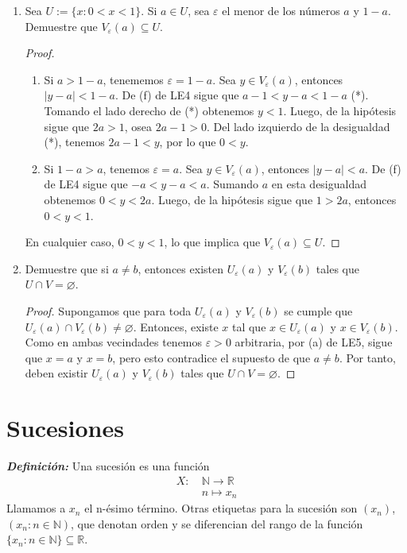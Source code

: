 \documentclass[11pt]{article}
\newcommand{\N}{\mathbb{N}}
\newcommand{\R}{\mathbb{R}}
\newcommand{\bfit}[1]{\textbf{\textit{#1}}}
\let\epsilon\varepsilon
\let\emptyset\varnothing
\begin{document}
\begin{enumerate}[label=\alph*)]
    \item Sea $U:=\{x: 0<x<1\}$. Si $a\in U$, sea $\varepsilon$ el menor de los números $a$ y $1-a$. Demuestre que $V_\varepsilon(a) \subseteq U$.
    \vspace{-1em}\begin{proof} \leavevmode
        \begin{enumerate}[label=\roman*)]
            \item Si $a>1-a$, tenememos $\varepsilon=1-a$. Sea $y\in V_\varepsilon(a)$, entonces $|y-a|<1-a$. De (f) de LE4 sigue que $a-1<y-a<1-a$ (*). Tomando el lado derecho de (*) obtenemos $y<1$. Luego, de la hipótesis sigue que $2a>1$, osea $2a-1>0$. Del lado izquierdo de la desigualdad (*), tenemos $2a-1<y$, por lo que $0<y$.
            \item Si $1-a>a$, tenemos $\varepsilon=a$. Sea $y\in V_\varepsilon(a)$, entonces $|y-a|<a$. De (f) de LE4 sigue que $-a<y-a<a$. Sumando $a$ en esta desigualdad obtenemos $0<y<2a$. Luego, de la hipótesis sigue que $1>2a$, entonces $0<y<1$.\end{enumerate}
            En cualquier caso, $0<y<1$, lo que implica que $V_\varepsilon(a) \subseteq U$.    
    \end{proof} \vspace{-1em}

    \item Demuestre que si $a\neq b$, entonces existen $U_\varepsilon(a)$ y $V_\varepsilon(b)$ tales que $U\cap V =\emptyset$.
    \vspace{-1em}\begin{proof} 
        Supongamos que para toda $U_\varepsilon(a)$ y $V_\varepsilon(b)$ se cumple que $U_\varepsilon(a) \cap V_\varepsilon(b) \neq \emptyset$. Entonces, existe $x$ tal que $x\in U_\varepsilon(a)$ y $x\in V_\varepsilon(b)$. Como en ambas vecindades tenemos $\epsilon>0$ arbitraria, por (a) de LE5, sigue que $x=a$ y $x=b$, pero esto contradice el supuesto de que $a\neq b$. Por tanto, deben existir $U_\varepsilon(a)$ y $V_\varepsilon(b)$ tales que $U\cap V =\emptyset$.    
    \end{proof} \vspace{-1em}
\end{enumerate}

\section*{Sucesiones}

\bfit{Definición:}  Una sucesión es una función %
\begin{align*}
    X: \ & \N \to \R \\
    \ &  n \mapsto x_n 
\end{align*}
%
Llamamos a $x_n$ el n-ésimo término. Otras etiquetas para la sucesión son $(x_n)$, $(x_n:n\in \N)$, que denotan orden y se diferencian del rango de la función $\{x_n:n\in \N\}\subseteq \R$.
\end{document}
